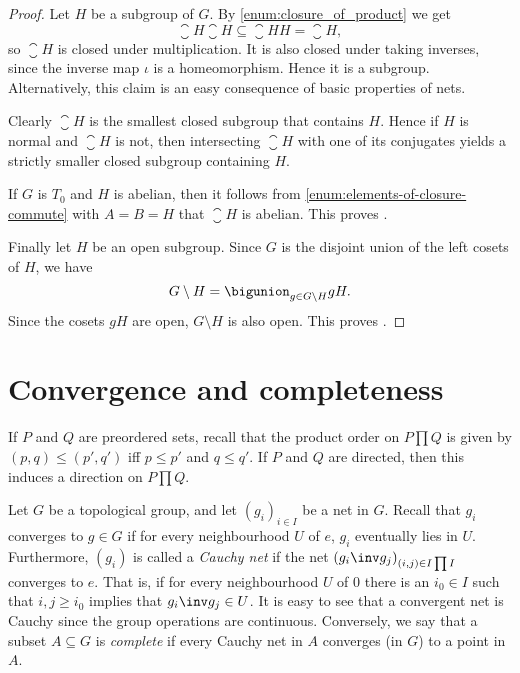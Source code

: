 \documentclass[article, a4paper, 11pt, oneside]{memoir}
\numberwithin{equation}{chapter}
\begin{document}
\begin{proof}
    Let $H$ be a subgroup of $G$. By \cref{enum:closure_of_product} we get
    \begin{equation*}
        \closure{H} \closure{H} \subseteq \closure{HH} = \closure{H},
    \end{equation*}
    so $\closure{H}$ is closed under multiplication. It is also closed under taking inverses, since the inverse map $\iota$ is a homeomorphism. Hence it is a subgroup. Alternatively, this claim is an easy consequence of basic properties of nets.

    Clearly $\closure{H}$ is the smallest closed subgroup that contains $H$. Hence if $H$ is normal and $\closure{H}$ is not, then intersecting $\closure{H}$ with one of its conjugates yields a strictly smaller closed subgroup containing $H$.

    If $G$ is $T_0$ and $H$ is abelian, then it follows from \cref{enum:elements-of-closure-commute} with $A = B = H$ that $\closure{H}$ is abelian. This proves .

    Finally let $H$ be an open subgroup. Since $G$ is the disjoint union of the left cosets of $H$, we have
    \begin{equation*}
        G \setminus H
            = \bigunion_{g \in G \setminus H} gH.
    \end{equation*}
    Since the cosets $gH$ are open, $G \setminus H$ is also open. This proves .
\end{proof}


\section{Convergence and completeness}

\renewcommand{\ball}[3][]{B_{#1}(#2,#3)}
\newcommand{\cball}[3][]{\overline{B}_{#1}(#2,#3)}
\newcommand{\pball}[3][]{B'_{#1}(#2,#3)}

If $P$ and $Q$ are preordered sets, recall that the product order on $P \prod Q$ is given by $(p,q) \leq (p',q')$ iff $p \leq p'$ and $q \leq q'$. If $P$ and $Q$ are directed, then this induces a direction on $P \prod Q$.

Let $G$ be a topological group, and let $(g_i)_{i \in I}$ be a net in $G$. Recall that $g_i$ converges to $g \in G$ if for every neighbourhood $U$ of $e$, $g_i$ eventually lies in $U$. Furthermore, $(g_i)$ is called a \emph{Cauchy net} if the net $(g_i\inv g_j)_{(i,j) \in I \prod I}$ converges to $e$. That is, if for every neighbourhood $U$ of $0$ there is an $i_0 \in I$ such that $i,j \geq i_0$ implies that $g_i\inv g_j \in U$. It is easy to see that a convergent net is Cauchy since the group operations are continuous. Conversely, we say that a subset $A \subseteq G$ is \emph{complete} if every Cauchy net in $A$ converges (in $G$) to a point in $A$.
\end{document}
